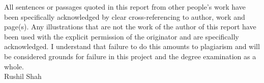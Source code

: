 \documentclass[../main.tex]{subfiles}
\begin{document}

All sentences or passages quoted in this report from other people's work have been specifically acknowledged by clear cross-referencing to author, work and page(s). Any illustrations that are not the work of the author of this report have been used with the explicit permission of the originator and are specifically acknowledged. I understand that failure to do this amounts to plagiarism and will be considered grounds for failure in this project and the degree examination as a whole.\\[16mm]
Rushil Shah
\end{document}
